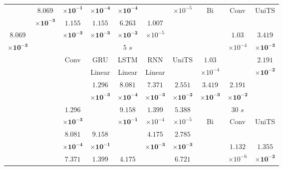\begin{table}[!ht]
{\begin{tabular}{|c|c|c|c|c|c|c|c|c|c|}
			\multirow{2}{*}{} & $\mathbf{8.069}$ & $\mathbf{\times 10^{-1}}$ & $\mathbf{\times 10^{-4}}$ & $\mathbf{\times 10^{-4}}$ & & $\times 10^{-5}$ & \multirow{2}{*}{Bi} & \multirow{2}{*}{Conv} & \multirow{2}{*}{UniTS} \\ \cline{3-7}
			 & $\mathbf{\times 10^{-3}}$ & $\mathbf{1.155}$ & $\mathbf{1.155}$ & $\mathbf{6.263}$ & $1.007$ & \multirow{2}{*}{} & & & \\ \cline{1-2} \cline{8-10}
			$\mathbf{8.069}$ & \multirow{2}{*}{} & $\mathbf{\times 10^{-3}}$ & $\mathbf{\times 10^{-3}}$ & $\mathbf{\times 10^{-2}}$ & $\times 10^{-5}$ & & \multirow{2}{*}{} & $1.03$ & $\mathbf{3.419}$\\ \cline{3-7}
			$\mathbf{\times 10^{-3}}$ & & \multicolumn{5}{c}{$5$ $s$} & & $\times 10^{-4}$ & $\mathbf{\times 10^{-3}}$\\ \cline{1-10}
			 \multicolumn{2}{c}{} & \multirow{2}{*}{Conv} & GRU & LSTM & RNN & \multirow{2}{*}{UniTS} & $1.03$ & \multirow{2}{*}{} & $\mathbf{2.191}$\\ 
			 \multicolumn{2}{c}{} & & Linear & Linear & Linear & & $\times 10^{-4}$ & & $\mathbf{\times 10^{-2}}$\\ \cline{3-10}
			 \multicolumn{2}{c}{} & \multirow{2}{*}{} & $\mathbf{1.296}$ & $\mathbf{8.081}$ & $\mathbf{7.371}$ & $\mathbf{2.551}$ & $\mathbf{3.419}$ & $\mathbf{2.191}$ & \multirow{2}{*}{} \\ 
			 \multicolumn{2}{c}{} & & $\mathbf{\times 10^{-3}}$ & $\mathbf{\times 10^{-4}}$ & $\mathbf{\times 10^{-3}}$ & $\mathbf{\times 10^{-2}}$ & $\mathbf{\times 10^{-3}}$ & $\mathbf{\times 10^{-2}}$ & \\ \cline{3-10}
			 \multicolumn{2}{c}{} & $\mathbf{1.296}$ & \multirow{2}{*}{} & $\mathbf{9.158}$ & $1.399$ & $5.388$ & \multicolumn{3}{c}{$30$ $s$} \\ \cline{8-10}
			 \multicolumn{2}{c}{} & $\mathbf{\times 10^{-3}}$ & & $\mathbf{\times 10^{-1}}$ & $\times 10^{-4}$ & $\times 10^{-5}$ & \multirow{2}{*}{Bi} & \multirow{2}{*}{Conv} & \multirow{2}{*}{UniTS} \\ \cline{3-7}
			 \multicolumn{2}{c}{} & $\mathbf{8.081}$ & $\mathbf{9.158}$ & \multirow{2}{*}{} & $\mathbf{4.175}$ & $\mathbf{2.785}$ & & & \\ \cline{8-10}
			 \multicolumn{2}{c}{} & $\mathbf{\times 10^{-4}}$ & $\mathbf{\times 10^{-1}}$ & & $\mathbf{\times 10^{-3}}$ & $\mathbf{\times 10^{-3}}$ & \multirow{2}{*}{} & $1.132$ & $\mathbf{1.355}$\\ \cline{3-7}
			 \multicolumn{2}{c}{} & $\mathbf{7.371}$ & $1.399$ & $\mathbf{4.175}$ & \multirow{2}{*}{} & $\mathbf{6.721}$ & & $\times 10^{-6}$ & $\mathbf{\times 10^{-2}}$\\ \cline{8-10}

\end{tabular}}
\end{table}
